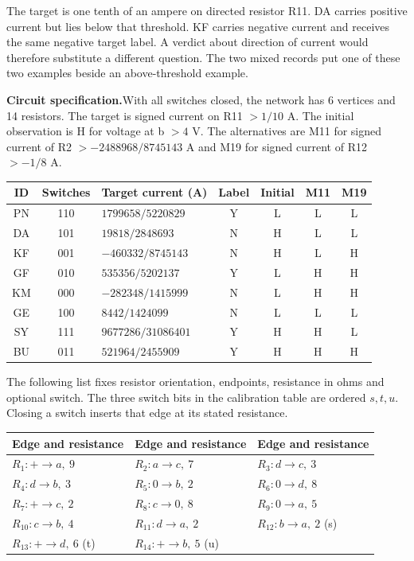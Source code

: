 \documentclass[12pt,letterpaper]{article}
\newcommand{\reading}[2]{\par\smallskip\textsf{\color{accent}\bfseries #1}\enspace #2\par}
\begin{document}
The target is one tenth of an ampere on directed resistor R11. DA carries positive current but lies below that threshold. KF carries negative current and receives the same negative target label. A verdict about direction of current would therefore substitute a different question. The two mixed records put one of these two examples beside an above-threshold example.

\reading{Circuit specification.}{With all switches closed, the network has 6 vertices and 14 resistors. The target is signed current on R11 $>1/10$ A. The initial observation is H for voltage at b $>4$ V. The alternatives are M11 for signed current of R2 $>-2488968/8745143$ A and M19 for signed current of R12 $>-1/8$ A.}

\begin{center}{\small\setlength{\tabcolsep}{4pt}\begin{tabularx}{\linewidth}{@{}ccYcccc@{}}\toprule
ID & Switches & Target current (A) & Label & Initial & M11 & M19\\ \midrule
PN & 110 & $1799658/5220829$ & Y & L & L & L\\
DA & 101 & $19818/2848693$ & N & H & L & L\\
KF & 001 & $-460332/8745143$ & N & H & L & H\\
GF & 010 & $535356/5202137$ & Y & L & H & H\\
KM & 000 & $-282348/1415999$ & N & L & H & H\\
GE & 100 & $8442/1424099$ & N & L & L & L\\
SY & 111 & $9677286/31086401$ & Y & H & H & L\\
BU & 011 & $521964/2455909$ & Y & H & H & H\\\bottomrule\end{tabularx}}\end{center}

The following list fixes resistor orientation, endpoints, resistance in ohms and optional switch. The three switch bits in the calibration table are ordered $s,t,u$. Closing a switch inserts that edge at its stated resistance.

\begin{center}{\footnotesize\setlength{\tabcolsep}{4pt}\begin{tabularx}{\linewidth}{@{}YYY@{}}\toprule
Edge and resistance & Edge and resistance & Edge and resistance\\ \midrule
$R_{1}\colon +\!\to\!a,\ 9$ & $R_{2}\colon a\!\to\!c,\ 7$ & $R_{3}\colon d\!\to\!c,\ 3$\\
$R_{4}\colon d\!\to\!b,\ 3$ & $R_{5}\colon 0\!\to\!b,\ 2$ & $R_{6}\colon 0\!\to\!d,\ 8$\\
$R_{7}\colon +\!\to\!c,\ 2$ & $R_{8}\colon c\!\to\!0,\ 8$ & $R_{9}\colon 0\!\to\!a,\ 5$\\
$R_{10}\colon c\!\to\!b,\ 4$ & $R_{11}\colon d\!\to\!a,\ 2$ & $R_{12}\colon b\!\to\!a,\ 2$ (s)\\
$R_{13}\colon +\!\to\!d,\ 6$ (t) & $R_{14}\colon +\!\to\!b,\ 5$ (u) & \\\bottomrule\end{tabularx}}\end{center}
\end{document}

